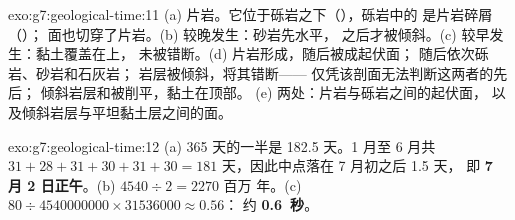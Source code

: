 \begin{solution}{exo:g7:geological-time:11}
(a) 片岩。它位于砾岩之下（），砾岩中的
是片岩碎屑（）；
面也切穿了片岩。(b) 较晚发生：砂岩先水平，
之后才被倾斜。(c) 较早发生：黏土覆盖在上，
未被错断。(d) 片岩形成，随后被成起伏面；
随后依次砾岩、砂岩和石灰岩；
岩层被倾斜，将其错断——
仅凭该剖面无法判断这两者的先后；
倾斜岩层和被削平，黏土在顶部。
(e) 两处：片岩与砾岩之间的起伏面，
以及倾斜岩层与平坦黏土层之间的面。
\end{solution}

\begin{solution}{exo:g7:geological-time:12}
(a) 365 天的一半是 182.5 天。1 月至 6 月共
$31+28+31+30+31+30 = 181$ 天，因此中点落在 7 月初之后 1.5 天，
即 \textbf{7 月 2 日正午}。(b) $4540 \div 2 = 2270$ 百万
年。(c) $80 \div \num{4540000000} \times \num{31536000} \approx 0.56$：
约 \textbf{0.6~秒}。
\end{solution}

